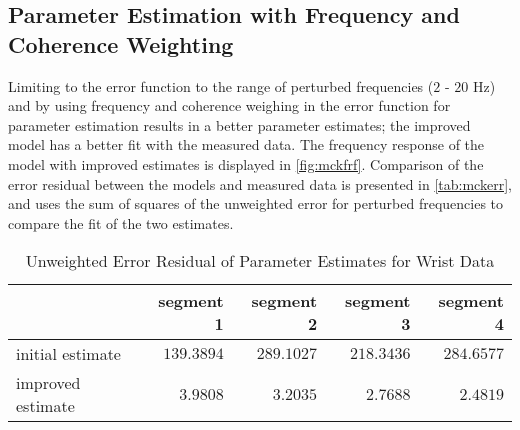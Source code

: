 \documentclass[11pt,a4paper]{article}
\begin{document}
\subsection{Parameter Estimation with Frequency and Coherence Weighting}
Limiting to the error function to the range of perturbed frequencies ($2$ -
$20$ Hz) and by using frequency and coherence weighing in the error function
for parameter estimation results in a better parameter estimates; the improved
model has a better fit with the measured data. The frequency response of the
model with improved estimates is displayed in \autoref{fig:mckfrf}. Comparison
of the error residual between the models and measured data is presented in
\autoref{tab:mckerr}, and uses the sum of squares of the unweighted error for
perturbed frequencies to compare the fit of the two estimates.

\begin{table}[hb]
    \centering
    \begin{tabular}{|l|r|r|r|r|}
        \hline
        \nonumber & segment 1 & segment 2 & segment 3 & segment 4 \\
        \hline
        initial estimate & $139.3894$ & $289.1027$ & $218.3436$ & $284.6577$ \\
        improved estimate & $3.9808$ & $3.2035$ & $2.7688$ & $2.4819$ \\
        \hline
    \end{tabular}
    \caption{Unweighted Error Residual of Parameter Estimates for Wrist Data}
    \label{tab:mckerr}
\end{table}

\end{document}
